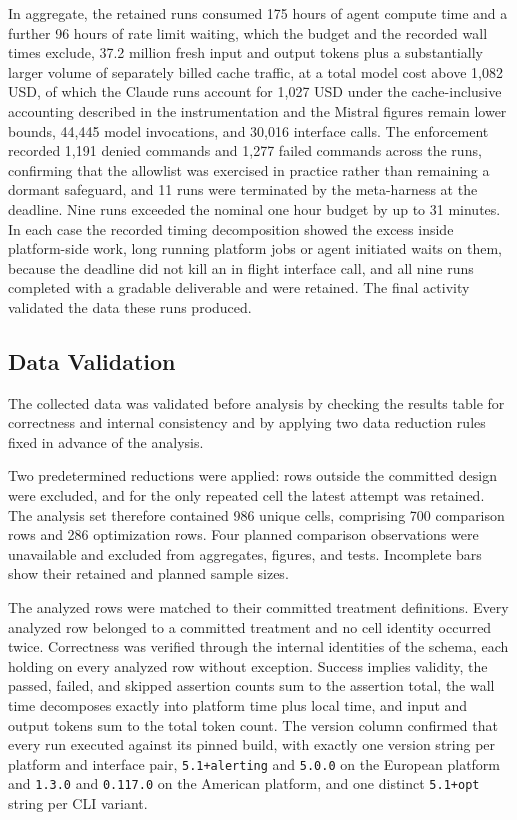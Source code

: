 \documentclass[
english,                 %
bibtex,                  %
]{kththesis}
\newcommand*{\retainedRunCount}{986}
\newcommand*{\retainedComparisonCount}{700}
\newcommand*{\retainedOptimizationCount}{286}
\newcommand*{\analysisComputeHours}{175}
\newcommand*{\analysisRateLimitHours}{96}
\newcommand*{\analysisFreshTokens}{37.2 million}
\newcommand*{\analysisModelCost}{1{,}082}
\newcommand*{\analysisClaudeCost}{1{,}027}
\newcommand*{\analysisModelInvocations}{44{,}445}
\newcommand*{\analysisInterfaceCalls}{30{,}016}
\newcommand*{\analysisDeniedCommands}{1{,}191}
\newcommand*{\analysisFailedCommands}{1{,}277}
\numberwithin{listing}{chapter}
\begin{document}
In aggregate, the retained runs consumed \analysisComputeHours{} hours of agent compute time and a further \analysisRateLimitHours{} hours of rate limit waiting, which the budget and the recorded wall times exclude, \analysisFreshTokens{} fresh input and output tokens plus a substantially larger volume of separately billed cache traffic, at a total model cost above \analysisModelCost{} \gls{USD}, of which the Claude runs account for \analysisClaudeCost{} \gls{USD} under the cache-inclusive accounting described in the instrumentation and the Mistral figures remain lower bounds, \analysisModelInvocations{} model invocations, and \analysisInterfaceCalls{} interface calls. The enforcement recorded \analysisDeniedCommands{} denied commands and \analysisFailedCommands{} failed commands across the runs, confirming that the allowlist was exercised in practice rather than remaining a dormant safeguard, and 11 runs were terminated by the meta-harness at the deadline. Nine runs exceeded the nominal one hour budget by up to 31 minutes. In each case the recorded timing decomposition showed the excess inside platform-side work, long running platform jobs or agent initiated waits on them, because the deadline did not kill an in flight interface call, and all nine runs completed with a gradable deliverable and were retained. The final activity validated the data these runs produced.

\subsection{Data Validation}
\label{sec:method_data_validation}
\glsresetall

The collected data was validated before analysis by checking the results table for correctness and internal consistency and by applying two data reduction rules fixed in advance of the analysis.

Two predetermined reductions were applied: rows outside the committed design were excluded, and for the only repeated cell the latest attempt was retained. The analysis set therefore contained \retainedRunCount{} unique cells, comprising \retainedComparisonCount{} comparison rows and \retainedOptimizationCount{} optimization rows. Four planned comparison observations were unavailable and excluded from aggregates, figures, and tests. Incomplete bars show their retained and planned sample sizes.

The analyzed rows were matched to their committed treatment definitions. Every analyzed row belonged to a committed treatment and no cell identity occurred twice. Correctness was verified through the internal identities of the schema, each holding on every analyzed row without exception. Success implies validity, the passed, failed, and skipped assertion counts sum to the assertion total, the wall time decomposes exactly into platform time plus local time, and input and output tokens sum to the total token count. The version column confirmed that every run executed against its pinned build, with exactly one version string per platform and interface pair, \texttt{5.1+alerting} and \texttt{5.0.0} on the European platform and \texttt{1.3.0} and \texttt{0.117.0} on the American platform, and one distinct \texttt{5.1+opt} string per \gls{CLI} variant.
\end{document}
